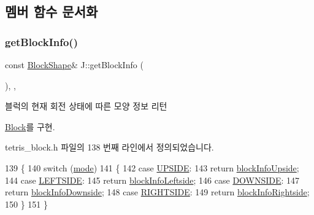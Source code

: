 \subsection{멤버 함수 문서화}
\mbox{\label{class_j_a2ef290578088ff6206767f6624748284}} 
\subsubsection{\texorpdfstring{get\+Block\+Info()}{getBlockInfo()}}
{\footnotesize\ttfamily const \mbox{\hyperlink{class_block_aca5d951639f113e2ebd7856209d6b9ab}{Block\+Shape}}\& J\+::get\+Block\+Info (\begin{DoxyParamCaption}{ }\end{DoxyParamCaption})\hspace{0.3cm}{\ttfamily [inline]}, {\ttfamily [override]}, {\ttfamily [virtual]}}



블럭의 현재 회전 상태에 따른 모양 정보 리턴 



\mbox{\hyperlink{class_block_a2cdc0af223d621add42ac6c37fede329}{Block}}를 구현.



tetris\+\_\+block.\+h 파일의 138 번째 라인에서 정의되었습니다.


\begin{DoxyCode}
139     \{
140         \textcolor{keywordflow}{switch} (\mbox{\hyperlink{class_j_a84f29c2144ce2c8ca0d369060589f0f4}{mode}})
141         \{
142         \textcolor{keywordflow}{case} \mbox{\hyperlink{class_block_a33a96023993478ad4b52426188454765a4529e89ca1c08cc5f81181e355719fad}{UPSIDE}}:
143             \textcolor{keywordflow}{return} \mbox{\hyperlink{class_j_ab2d6ad0a92ed645027ee423bb4ff660b}{blockInfoUpside}};
144         \textcolor{keywordflow}{case} \mbox{\hyperlink{class_block_a33a96023993478ad4b52426188454765a9c855bf91465e7da98901d7900740919}{LEFTSIDE}}:
145             \textcolor{keywordflow}{return} \mbox{\hyperlink{class_j_a3772ed06ecd269c9bb646acb32ba1e57}{blockInfoLeftside}};
146         \textcolor{keywordflow}{case} \mbox{\hyperlink{class_block_a33a96023993478ad4b52426188454765a73fd4ad0ff8642235ec8549f9290d13b}{DOWNSIDE}}:
147             \textcolor{keywordflow}{return} \mbox{\hyperlink{class_j_a8729720907e14a70874f8daa0b3f2971}{blockInfoDownside}};
148         \textcolor{keywordflow}{case} \mbox{\hyperlink{class_block_a33a96023993478ad4b52426188454765a005424e665ea0b83edfaf9ddb3ab85a1}{RIGHTSIDE}}:
149             \textcolor{keywordflow}{return} \mbox{\hyperlink{class_j_a412d1f5ebc3078b09d5568c16c741a25}{blockInfoRightside}};
150         \}
151     \}
\end{DoxyCode}
\mbox{\label{class_j_a9055b5b54907c2fe1b9973cd74fc9c3e}} 
